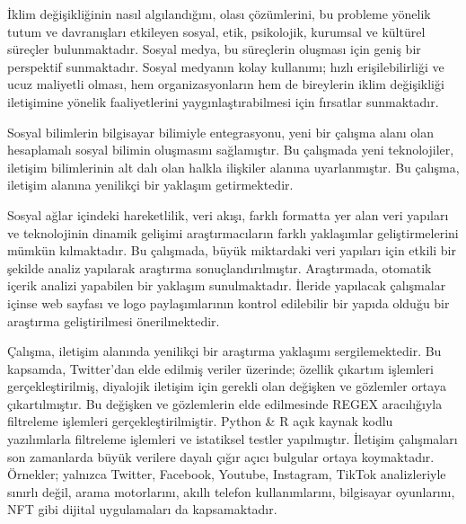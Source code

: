 \documentclass[
]{book}
\begin{document}
İklim değişikliğinin nasıl algılandığını, olası çözümlerini, bu probleme yönelik tutum ve davranışları etkileyen sosyal, etik, psikolojik, kurumsal ve kültürel süreçler bulunmaktadır. Sosyal medya, bu süreçlerin oluşması için geniş bir perspektif sunmaktadır. Sosyal medyanın kolay kullanımı; hızlı erişilebilirliği ve ucuz maliyetli olması, hem organizasyonların hem de bireylerin iklim değişikliği iletişimine yönelik faaliyetlerini yaygınlaştırabilmesi için fırsatlar sunmaktadır.

Sosyal bilimlerin bilgisayar bilimiyle entegrasyonu, yeni bir çalışma alanı olan hesaplamalı sosyal bilimin oluşmasını sağlamıştır. Bu çalışmada yeni teknolojiler, iletişim bilimlerinin alt dalı olan halkla ilişkiler alanına uyarlanmıştır. Bu çalışma, iletişim alanına yenilikçi bir yaklaşım getirmektedir.

Sosyal ağlar içindeki hareketlilik, veri akışı, farklı formatta yer alan veri yapıları ve teknolojinin dinamik gelişimi araştırmacıların farklı yaklaşımlar geliştirmelerini mümkün kılmaktadır. Bu çalışmada, büyük miktardaki veri yapıları için etkili bir şekilde analiz yapılarak araştırma sonuçlandırılmıştır. Araştırmada, otomatik içerik analizi yapabilen bir yaklaşım sunulmaktadır. İleride yapılacak çalışmalar içinse web sayfası ve logo paylaşımlarının kontrol edilebilir bir yapıda olduğu bir araştırma geliştirilmesi önerilmektedir.

Çalışma, iletişim alanında yenilikçi bir araştırma yaklaşımı sergilemektedir. Bu kapsamda, Twitter'dan elde edilmiş veriler üzerinde; özellik çıkartım işlemleri gerçekleştirilmiş, diyalojik iletişim için gerekli olan değişken ve gözlemler ortaya çıkartılmıştır. Bu değişken ve gözlemlerin elde edilmesinde REGEX aracılığıyla filtreleme işlemleri gerçekleştirilmiştir. Python \& R açık kaynak kodlu yazılımlarla filtreleme işlemleri ve istatiksel testler yapılmıştır. İletişim çalışmaları son zamanlarda büyük verilere dayalı çığır açıcı bulgular ortaya koymaktadır. Örnekler; yalnızca Twitter, Facebook, Youtube, Instagram, TikTok analizleriyle sınırlı değil, arama motorlarını, akıllı telefon kullanımlarını, bilgisayar oyunlarını, NFT gibi dijital uygulamaları da kapsamaktadır.
\end{document}

